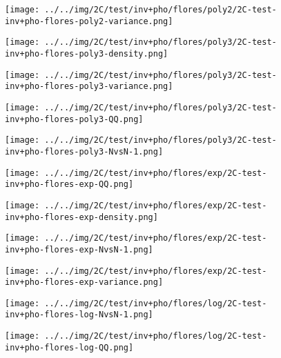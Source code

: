 \begin{figure}[H]
\centering	\texttt{[image: ../../img/2C/test/inv+pho/flores/poly2/2C-test-inv+pho-flores-poly2-variance.png]}
\end{figure}
\begin{figure}[H]
\centering	\texttt{[image: ../../img/2C/test/inv+pho/flores/poly3/2C-test-inv+pho-flores-poly3-density.png]}
\end{figure}
\begin{figure}[H]
\centering	\texttt{[image: ../../img/2C/test/inv+pho/flores/poly3/2C-test-inv+pho-flores-poly3-variance.png]}
\end{figure}
\begin{figure}[H]
\centering	\texttt{[image: ../../img/2C/test/inv+pho/flores/poly3/2C-test-inv+pho-flores-poly3-QQ.png]}
\end{figure}
\begin{figure}[H]
\centering	\texttt{[image: ../../img/2C/test/inv+pho/flores/poly3/2C-test-inv+pho-flores-poly3-NvsN-1.png]}
\end{figure}
\begin{figure}[H]
\centering	\texttt{[image: ../../img/2C/test/inv+pho/flores/exp/2C-test-inv+pho-flores-exp-QQ.png]}
\end{figure}
\begin{figure}[H]
\centering	\texttt{[image: ../../img/2C/test/inv+pho/flores/exp/2C-test-inv+pho-flores-exp-density.png]}
\end{figure}
\begin{figure}[H]
\centering	\texttt{[image: ../../img/2C/test/inv+pho/flores/exp/2C-test-inv+pho-flores-exp-NvsN-1.png]}
\end{figure}
\begin{figure}[H]
\centering	\texttt{[image: ../../img/2C/test/inv+pho/flores/exp/2C-test-inv+pho-flores-exp-variance.png]}
\end{figure}
\begin{figure}[H]
\centering	\texttt{[image: ../../img/2C/test/inv+pho/flores/log/2C-test-inv+pho-flores-log-NvsN-1.png]}
\end{figure}
\begin{figure}[H]
\centering	\texttt{[image: ../../img/2C/test/inv+pho/flores/log/2C-test-inv+pho-flores-log-QQ.png]}
\end{figure}
